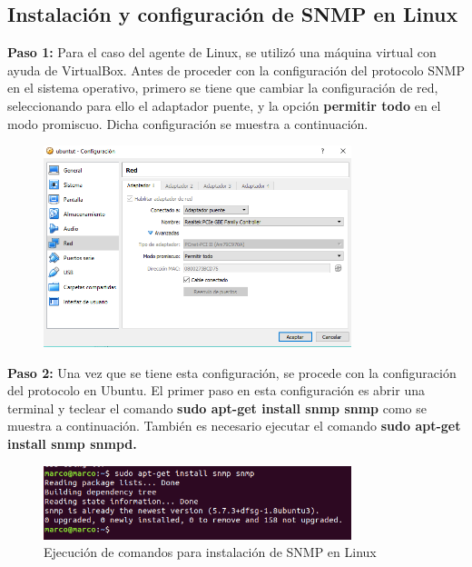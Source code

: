 \pagebreak
\subsection{Instalación y configuración de SNMP en Linux}

\noindent
\newline
\textbf{Paso 1:} Para el caso del agente de Linux, se utilizó una máquina virtual con ayuda de VirtualBox. Antes de proceder con la configuración del protocolo SNMP en el sistema operativo, primero se tiene que cambiar la configuración de red, seleccionando para ello el adaptador puente, y la opción \textbf{permitir todo} en el modo promiscuo. Dicha configuración se muestra a continuación.

\begin{figure}[htbp!]
	\centering
		\includegraphics[width=0.8\textwidth]{images/desarrollo/configuracion_linux1.png}
	\caption{}
\end{figure}

\noindent
\newline
\textbf{Paso 2:} Una vez que se tiene esta configuración, se procede con la configuración del protocolo en Ubuntu. El primer paso en esta configuración es abrir una terminal y teclear el comando \textbf{sudo apt-get install snmp snmp} como se muestra a continuación.
También es necesario ejecutar el comando \textbf{sudo apt-get install snmp snmpd.}

\begin{figure}[htbp!]
	\centering
		\includegraphics[width=0.8\textwidth]{images/desarrollo/configuracion_linux2.png}
	\caption{Ejecución de comandos para instalación de SNMP en Linux}
\end{figure}

